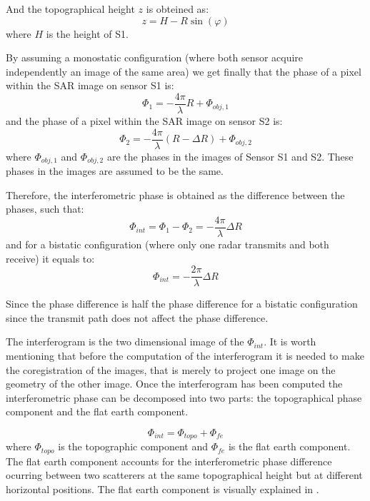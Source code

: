 And the topographical height $z$ is obteined as: 
\begin{equation}
    z = H - R\sin(\varphi)
\end{equation}
where $H$ is the height of S1.

By assuming a monostatic configuration (where both sensor acquire independently an image of the same area) we get 
finally that the phase of a pixel within the SAR image on sensor S1 is:
\begin{equation}
    \Phi_1 = -\frac{4\pi}{\lambda} R + \Phi_{obj,1}
\end{equation}
and the phase of a pixel within the SAR image on sensor S2 is:
\begin{equation}
    \Phi_2 = -\frac{4\pi}{\lambda} (R - \Delta R) + \Phi_{obj,2}
\end{equation}
where $\Phi_{obj,1}$ and $\Phi_{obj,2}$ are the phases in the images of Sensor S1 and S2. These phases in the images are assumed to be the same.

Therefore, the interferometric phase is obtained as the difference between the phases, such that:
\begin{equation}
    \Phi_{int} = \Phi_{1} - \Phi_{2} = -\frac{4 \pi}{\lambda} \Delta R
\end{equation}
and for a bistatic configuration (where only one radar transmits and both receive) it equals to:
\begin{equation}
    \Phi_{int} = -\frac{2 \pi}{\lambda} \Delta R
\end{equation}


Since the phase difference is half the phase difference for a bistatic configuration since the transmit path does not affect the phase difference.

The interferogram is the two dimensional image of the $\Phi_{int}$. It is worth mentioning that before the computation of the interferogram it is needed to make the coregistration of the images, that is merely to project one image on the geometry of the other image.
Once the interferogram has been computed the interferometric phase can be decomposed into two parts: the topographical phase component and the flat earth component.

\begin{equation}
    \Phi_{int} = \Phi_{topo} + \Phi_{fe}
\end{equation}
where $\Phi_{topo}$ is the topographic component and $\Phi_{fe}$ is the flat earth component.
The flat earth component accounts for the interferometric phase difference ocurring between two scatterers at the same topographical height but at different horizontal positions. The flat earth component is visually explained in .

